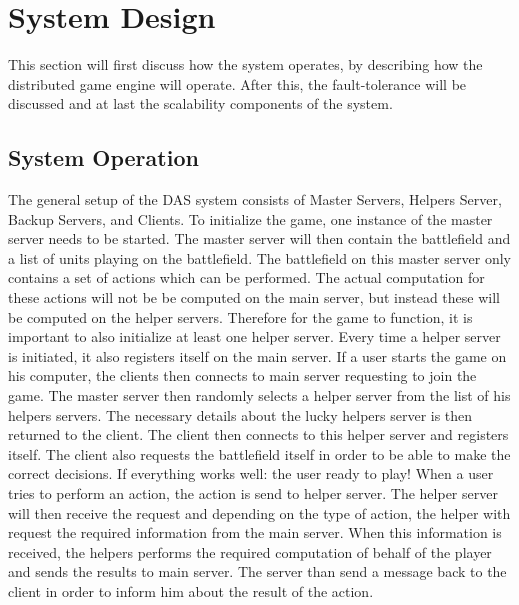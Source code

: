 \section{System Design}
This section will first discuss how the system operates, by describing how the distributed game engine will operate.
After this, the fault-tolerance will be discussed and at last the scalability components of the system.

\subsection{System Operation}
The general setup of the DAS system consists of Master Servers, Helpers Server, Backup Servers, and Clients.
To initialize the game, one instance of the master server needs to be started. 
The master server will then contain the battlefield and a list of units playing on the battlefield.
The battlefield on this master server only contains a set of actions which can be performed.
The actual computation for these actions will not be be computed on the main server, but instead these will be computed on the helper servers.
Therefore for the game to function, it is important to also initialize at least one helper server. 
Every time a helper server is initiated, it also registers itself on the main server.
If a user starts the game on his computer, the clients then connects to main server requesting to join the game.
The master server then randomly selects a helper server from the list of his helpers servers.
The necessary details about the lucky helpers server is then returned to the client. 
The client then connects to this helper server and registers itself.
The client also requests the battlefield itself in order to be able to make the correct decisions. 
If everything works well: the user ready to play!
When a user tries to perform an action, the action is send to helper server.
The helper server will then receive the request and depending on the type of action, the helper with request the required information from the main server.
When this information is received, the helpers performs the required computation of behalf of the player and sends the results to main server.
The server than send a message back to the client in order to inform him about the result of the action.

